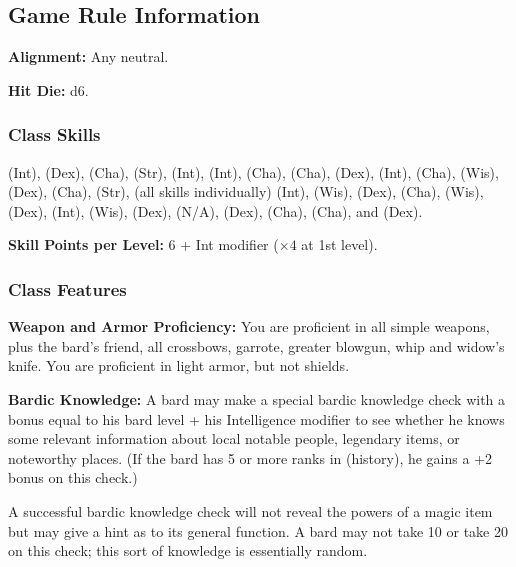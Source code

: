 \subsection{Game Rule Information}
\textbf{Alignment:} Any neutral.

\textbf{Hit Die:} d6.

\subsubsection{Class Skills}
 (Int),  (Dex),  (Cha),  (Str),  (Int),  (Int),  (Cha),  (Cha),  (Dex),  (Int),  (Cha),  (Wis),  (Dex),  (Cha),  (Str),  (all skills individually) (Int),  (Wis),  (Dex),  (Cha),  (Wis),  (Dex),  (Int),  (Wis),  (Dex),  (N/A),  (Dex),  (Cha),  (Cha), and  (Dex).

\textbf{Skill Points per Level:} 6 + Int modifier ($\times4$ at 1st level).

\subsubsection{Class Features}

\textbf{Weapon and Armor Proficiency:} You are proficient in all simple weapons, plus the bard's friend, all crossbows, garrote, greater blowgun, whip and widow's knife. You are proficient in light armor, but not shields.

\textbf{Bardic Knowledge:} A bard may make a special bardic knowledge check with a bonus equal to his bard level + his Intelligence modifier to see whether he knows some relevant information about local notable people, legendary items, or noteworthy places. (If the bard has 5 or more ranks in  (history), he gains a +2 bonus on this check.)

A successful bardic knowledge check will not reveal the powers of a magic item but may give a hint as to its general function. A bard may not take 10 or take 20 on this check; this sort of knowledge is essentially random.


